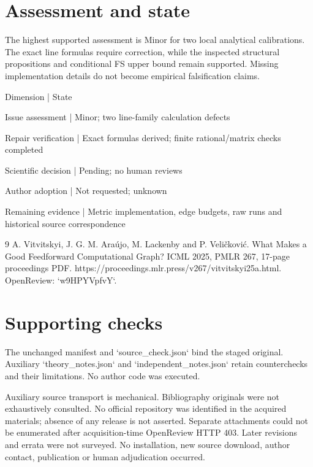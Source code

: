 \documentclass[10pt]{article}
\begin{document}
\section*{Assessment and state}
The highest supported assessment is Minor for two local analytical calibrations. The exact line formulas require correction, while the inspected structural propositions and conditional FS upper bound remain supported. Missing implementation details do not become empirical falsification claims.\par
Dimension | State\par
Issue assessment | Minor; two line-family calculation defects\par
Repair verification | Exact formulas derived; finite rational/matrix checks completed\par
Scientific decision | Pending; no human reviews\par
Author adoption | Not requested; unknown\par
Remaining evidence | Metric implementation, edge budgets, raw runs and historical source correspondence\par
9 A. Vitvitskyi, J. G. M. Araújo, M. Lackenby and P. Veličković. What Makes a Good Feedforward Computational Graph? ICML 2025, PMLR 267, 17-page proceedings PDF. https://proceedings.mlr.press/v267/vitvitskyi25a.html. OpenReview: `w9HPYVpfvY`.\par
\section*{Supporting checks}
The unchanged manifest and `source\_check.json` bind the staged original. Auxiliary `theory\_notes.json` and `independent\_notes.json` retain counterchecks and their limitations. No author code was executed.\par
Auxiliary source transport is mechanical. Bibliography originals were not exhaustively consulted. No official repository was identified in the acquired materials; absence of any release is not asserted. Separate attachments could not be enumerated after acquisition-time OpenReview HTTP 403. Later revisions and errata were not surveyed. No installation, new source download, author contact, publication or human adjudication occurred.\par
\end{document}
